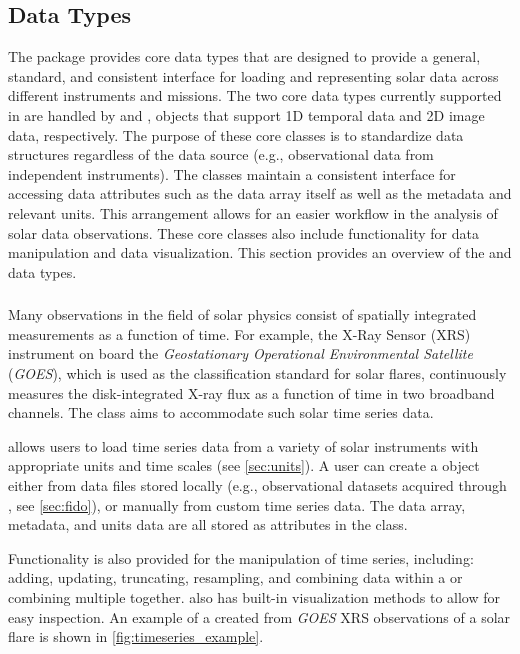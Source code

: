 \subsection{Data Types}
\label{sec:data_types}

The \sunpypkg package provides core data types that are designed to provide a general, standard, and consistent interface for loading and representing solar data across different instruments and missions.
The two core data types currently supported in \sunpypkg are handled by \Timeseries and \Map, objects that support 1D temporal data and 2D image data, respectively.
The purpose of these core classes is to standardize data structures regardless of the data source (e.g., observational data from independent instruments).
The classes maintain a consistent interface for accessing data attributes such as the data array itself as well as the metadata and relevant units.
This arrangement allows for an easier workflow in the analysis of solar data observations.
These core classes also include functionality for data manipulation and data visualization.
This section provides an overview of the \Timeseries and \Map data types.

\subsubsection{\Timeseries}
\label{sec:timeseries}
Many observations in the field of solar physics consist of spatially integrated measurements as a function of time.
For example, the X-Ray Sensor (XRS) instrument on board the \textit{Geostationary Operational Environmental Satellite} (\textit{GOES}), which is used as the classification standard for solar flares, continuously measures the disk-integrated X-ray flux as a function of time in two broadband channels.
The \Timeseries class aims to accommodate such solar time series data.

\Timeseries allows users to load time series data from a variety of solar instruments with appropriate units and time scales (see \autoref{sec:units}).
 A user can create a \Timeseries object either from data files stored locally (e.g., observational datasets acquired through \Fido, see \autoref{sec:fido}), or manually from custom time series data.
 The data array, metadata, and units data are all stored as attributes in the \Timeseries class.

Functionality is also provided for the manipulation of time series, including: adding, updating, truncating, resampling, and combining data within a \Timeseries or combining multiple \Timeseries together.
\Timeseries also has built-in visualization methods to allow for easy inspection.
An example of a \Timeseries created from \textit{GOES} XRS observations of a solar flare is shown in \autoref{fig:timeseries_example}.

